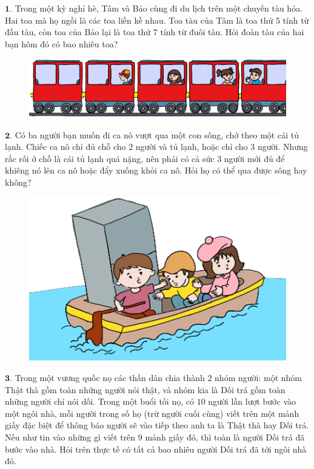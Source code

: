 \begin{multicols}{2}
	$\pmb{1.}$ Trong một kỳ nghỉ hè, Tâm và Bảo cùng đi du lịch trên một chuyến tàu hỏa. Hai toa mà họ ngồi là các toa liền kề nhau. Toa tàu của Tâm là toa thứ $5$ tính từ đầu tàu, còn toa  của Bảo lại là toa thứ $7$ tính từ đuôi tàu. Hỏi đoàn tàu của hai bạn hôm đó có bao nhiêu toa?
	\begin{figure}[H]
		\vspace*{-5pt}
		\centering
		\captionsetup{labelformat= empty, justification=centering}
		\includegraphics[width= 1\linewidth]{b1}
		\vspace*{-15pt}
	\end{figure}
	$\pmb{2.}$	Có ba người bạn muốn đi ca nô vượt qua một con sông, chở theo một cái tủ lạnh. Chiếc ca nô chỉ đủ chỗ cho $2$ người và tủ lạnh, hoặc chỉ cho $3$ người. Nhưng rắc rối ở chỗ là cái tủ lạnh quá nặng, nên phải có cả sức $3$ người mới đủ để khiêng nó lên ca nô hoặc đẩy xuống khỏi ca nô. Hỏi họ có thể qua được sông hay không?
	\begin{figure}[H]
		\vspace*{-10pt}
		\centering
		\captionsetup{labelformat= empty, justification=centering}
		\includegraphics[width= 1\linewidth]{b2}
		\vspace*{-15pt}
	\end{figure}
	$\pmb{3.}$ Trong một vương quốc nọ các thần dân chia thành $2$ nhóm người: một nhóm Thật thà gồm toàn những người nói thật, và nhóm kia là Dối trá gồm toàn những người chỉ nói dối. Trong một buổi tối nọ, có $10$ người lần lượt bước vào một ngôi nhà, mỗi người trong số họ (trừ người cuối cùng) viết trên một mảnh giấy đặc biệt để thông báo người sẽ vào tiếp theo anh ta là Thật thà hay Dối trá. Nếu như tin vào những gì viết trên $9$ mảnh giấy đó, thì toàn là người Dối trá đã bước vào nhà. Hỏi trên thực tế có tất cả bao nhiêu người Dối trá đã tới ngôi nhà đó.	

\end{multicols}
